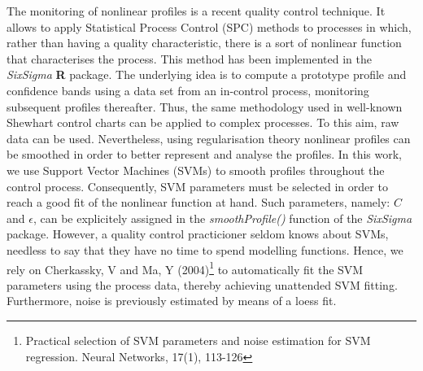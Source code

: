 \documentclass[\main/boa.tex]{subfiles}
\begin{document}
The monitoring of nonlinear profiles is a recent quality control
technique. It allows to apply Statistical Process Control (SPC) methods
to processes in which, rather than having a quality characteristic,
there is a sort of nonlinear function that characterises the process.
This method has been implemented in the \emph{SixSigma} \textbf{R}
package. The underlying idea is to compute a prototype profile and
confidence bands using a data set from an in-control process, monitoring
subsequent profiles thereafter. Thus, the same methodology used in
well-known Shewhart control charts can be applied to complex processes.
To this aim, raw data can be used. Nevertheless, using regularisation
theory nonlinear profiles can be smoothed in order to better represent
and analyse the profiles. In this work, we use Support Vector Machines
(SVMs) to smooth profiles throughout the control process. Consequently,
SVM parameters must be selected in order to reach a good fit of the
nonlinear function at hand. Such parameters, namely: \(C\) and
\(\epsilon\), can be explicitely assigned in the \emph{smoothProfile()}
function of the \emph{SixSigma} package. However, a quality control
practicioner seldom knows about SVMs, needless to say that they have no
time to spend modelling functions. Hence, we rely on Cherkassky, V and 
Ma, Y (2004)\footnote{Practical selection of SVM parameters and noise
estimation for SVM regression. Neural Networks, 17(1), 113-126} to 
automatically fit the SVM parameters using the process data, thereby 
achieving unattended SVM fitting. Furthermore, noise is previously 
estimated by means of a loess fit.
\end{document}
